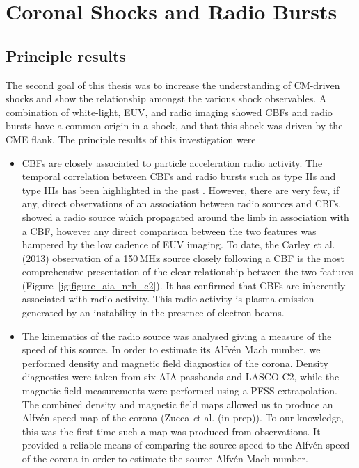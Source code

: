 \section{Coronal Shocks and Radio Bursts}

\subsection{Principle results}
The second goal of this thesis was to increase the understanding of CM-driven shocks and show the relationship amongst the various shock observables. A combination of white-light, EUV, and radio imaging showed CBFs and radio bursts have a common origin in a shock, and that this shock was driven by the CME flank. The principle results of this investigation were
\begin{itemize}
\item CBFs are closely associated to particle acceleration radio activity. The temporal correlation between CBFs and radio bursts such as type IIs and type IIIs has been highlighted in the past \citep{klassen2000, maia2004}. However, there are very few, if any, direct observations of an association between radio sources and CBFs. \citet{vrsnak2005a} showed a radio source which propagated around the limb in association with a CBF, however any direct comparison between the two features was hampered by the low cadence of EUV imaging. To date, the Carley {\emph et al.} (2013) observation of a 150\,MHz source closely following a CBF is the most comprehensive presentation of the clear relationship between the two features (Figure~\ref{ig:figure_aia_nrh_c2}). It has confirmed that CBFs are inherently associated with radio activity. This radio activity is plasma emission generated by an instability in the presence of electron beams.
\item The kinematics of the radio source was analysed giving a measure of the speed of this source. In order to estimate its Alfv\'{e}n Mach number, we performed density and magnetic field diagnostics of the corona. Density diagnostics were taken from six AIA passbands and LASCO C2, while the magnetic field measurements were performed using a PFSS extrapolation. The combined density and magnetic field maps allowed us to produce an Alfv\'{e}n speed map of the corona (Zucca {\emph et al.} (in prep)). To our knowledge, this was the first time such a map was produced from observations. It provided a reliable means of comparing the source speed to the Alfv\'{e}n speed of the corona in order to estimate the source Alfv\'{e}n Mach number.

\end{itemize}
